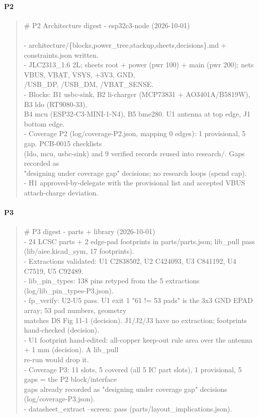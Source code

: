 \documentclass[11pt]{article}
\begin{document}
\paragraph*{P2}
\begin{quote}\small\ttfamily\raggedright
\# P2 Architecture digest - esp32c3-node (2026-10-01)\\
~\\
- architecture/\{blocks,power\_tree,stackup,sheets,decisions\}.md + constraints.json written.\\
- JLC2313\_1.6 2L; sheets root + power (pwr 100) + main (pwr 200); nets VBUS, VBAT, VSYS, +3V3, GND,\\
  /USB\_DP, /USB\_DM, /VBAT\_SENSE.\\
- Blocks: B1 usbc-sink, B2 li-charger (MCP73831 + AO3401A/B5819W), B3 ldo (RT9080-33),\\
  B4 mcu (ESP32-C3-MINI-1-N4), B5 bme280. U1 antenna at top edge, J1 bottom edge.\\
- Coverage P2 (log/coverage-P2.json, mapping 0 edges): 1 provisional, 5 gap. PCB-0015 checklists\\
  (ldo, mcu, usbc-sink) and 9 verified records reused into research/. Gaps recorded as\\
  "designing under coverage gap" decisions; no research loops (spend cap).\\
- H1 approved-by-delegate with the provisional list and accepted VBUS attach-charge deviation.
\end{quote}
\paragraph*{P3}
\begin{quote}\small\ttfamily\raggedright
\# P3 digest - parts + library (2026-10-01)\\
- 24 LCSC parts + 2 edge-pad footprints in parts/parts.json; lib\_pull pass (lib/aiee.kicad\_sym, 17 footprints).\\
- Extractions validated: U1 C2838502, U2 C424093, U3 C841192, U4 C7519, U5 C92489.\\
- lib\_pin\_types: 138 pins retyped from the 5 extractions (log/lib\_pin\_types-P3.json).\\
- fp\_verify: U2-U5 pass. U1 exit 1 "61 != 53 pads" is the 3x3 GND EPAD array; 53 pad numbers, geometry\\
  matches DS Fig 11-1 (decision). J1/J2/J3 have no extraction; footprints hand-checked (decision).\\
- U1 footprint hand-edited: all-copper keep-out rule area over the antenna + 1 mm (decision). A lib\_pull\\
  re-run would drop it.\\
- Coverage P3: 11 slots, 5 covered (all 5 IC part slots), 1 provisional, 5 gaps = the P2 block/interface\\
  gaps already recorded as "designing under coverage gap" decisions (log/coverage-P3.json).\\
- datasheet\_extract --screen: pass (parts/layout\_implications.json).
\end{quote}
\end{document}
